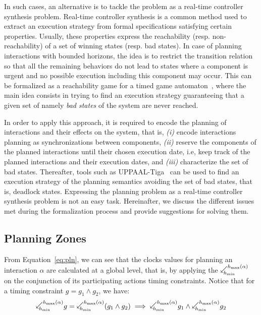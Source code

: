 In such cases, an alternative is to tackle the problem as a real-time controller synthesis 
problem. Real-time controller synthesis is a common method used to extract an execution 
strategy from formal specifications satisfying certain properties. Usually, these properties 
express the reachability (resp. non-reachability) of a set of winning states (resp. bad states).
In case of planning interactions with bounded horizons, the idea is to restrict the 
transition relation so that all the remaining 
behaviors do not lead to states where a component is urgent and no possible execution
including this component may occur. This can be formalized as a reachability game for a timed
game automaton~\cite{tiga:alg}, where the main idea consists in trying to find an execution 
strategy guaranteeing that a given set of namely \emph{bad states} of the system are never
reached.

In order to apply this approach, it is required to encode the planning of interactions 
and their effects on the system, that is, \emph{(i)} encode interactions planning as 
synchronizations between components, \emph{(ii)} reserve the components of the planned 
interactions until their chosen execution date, i.e, keep track of the planned interactions 
and their execution dates, and \emph{(iii)} characterize the set of bad states. 
Thereafter, tools such as UPPAAL-Tiga~\cite{tiga} can be used to find an execution strategy of 
the planning semantics avoiding the set of bad states, that is, deadlock states.
Expressing the planning problem as a real-time controller synthesis problem is not 
an easy task. Hereinafter, we discuss the different issues met during the formalization 
process and provide suggestions for solving them.
\subsection{Planning Zones}

From Equation~\ref{eq:pln}, we can see that the clocks values for planning an interaction 
$\alpha$ are calculated at a global level, that is, by applying the 
$\backwardp{\hmin}{\hmx}$ on the conjunction of its participating actions timing constraints.
Notice that for a timing constraint $g=g_1\wedge g_2$, we have:
\begin{equation}\label{eq:plz}
  \backwardp{\hmin}{\hmx} g=\backwardp{\hmin}{\hmx}(g_1\wedge g_2) \implies\backwardp{\hmin}{\hmx}
  g_1\wedge\backwardp{\hmin}{\hmx} g_2
\end{equation}

